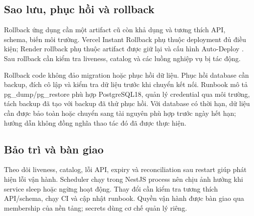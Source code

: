 \subsection{Sao lưu, phục hồi và rollback}
Rollback ứng dụng cần một artifact cũ còn khả dụng và tương thích API,
schema, biến môi trường. Vercel Instant Rollback phụ thuộc deployment đủ
điều kiện; Render rollback phụ thuộc artifact được giữ lại và cấu hình
Auto-Deploy \cite{renderdeploy,vercelrollback}. Sau rollback cần kiểm tra
liveness, catalog và các luồng nghiệp vụ bị tác động.

Rollback code không đảo migration hoặc phục hồi dữ liệu. Phục hồi database
cần backup, đích cô lập và kiểm tra dữ liệu trước khi chuyển kết nối.
Runbook mô tả pg\_dump/pg\_restore phù hợp PostgreSQL18, quản lý credential
qua môi trường, tách backup đã tạo với backup đã thử phục hồi. Với database
có thời hạn, dữ liệu cần được bảo toàn hoặc chuyển sang tài nguyên phù hợp
trước ngày hết hạn; hướng dẫn không đồng nghĩa thao tác đó đã được thực hiện.

\subsection{Bảo trì và bàn giao}
Theo dõi liveness, catalog, lỗi API, expiry và reconciliation sau restart
giúp phát hiện lỗi vận hành. Scheduler chạy trong NestJS process nên chịu
ảnh hưởng khi service sleep hoặc ngừng hoạt động. Thay đổi cần kiểm tra
tương thích API/schema, chạy CI và cập nhật runbook. Quyền vận hành được
bàn giao qua membership của nền tảng; secrets dùng cơ chế quản lý riêng.
